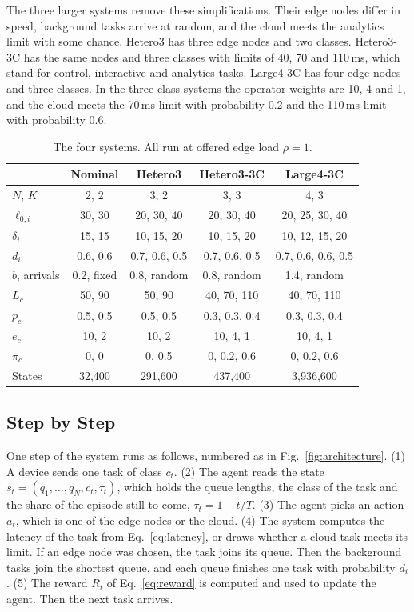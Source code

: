 The three larger systems remove these simplifications. Their edge nodes differ in speed, background tasks arrive at random, and the cloud meets the analytics limit with some chance. Hetero3 has three edge nodes and two classes. Hetero3-3C has the same nodes and three classes with limits of 40, 70 and 110\,ms, which stand for control, interactive and analytics tasks. Large4-3C has four edge nodes and three classes. In the three-class systems the operator weights are 10, 4 and 1, and the cloud meets the 70\,ms limit with probability 0.2 and the 110\,ms limit with probability 0.6.

\begin{table}[t]
\caption{The four systems. All run at offered edge load $\rho=1$.}
\label{tab:systems}
\centering
\footnotesize
\setlength{\tabcolsep}{2.5pt}
\begin{tabular}{@{}lcccc@{}}
\toprule
 & Nominal & Hetero3 & Hetero3-3C & Large4-3C \\
\midrule
$N$, $K$ & 2, 2 & 3, 2 & 3, 3 & 4, 3 \\
$\ell_{0,i}$ & 30, 30 & 20, 30, 40 & 20, 30, 40 & 20, 25, 30, 40 \\
$\delta_i$ & 15, 15 & 10, 15, 20 & 10, 15, 20 & 10, 12, 15, 20 \\
$d_i$ & 0.6, 0.6 & 0.7, 0.6, 0.5 & 0.7, 0.6, 0.5 & 0.7, 0.6, 0.6, 0.5 \\
$b$, arrivals & 0.2, fixed & 0.8, random & 0.8, random & 1.4, random \\
$L_c$ & 50, 90 & 50, 90 & 40, 70, 110 & 40, 70, 110 \\
$p_c$ & 0.5, 0.5 & 0.5, 0.5 & 0.3, 0.3, 0.4 & 0.3, 0.3, 0.4 \\
$e_c$ & 10, 2 & 10, 2 & 10, 4, 1 & 10, 4, 1 \\
$\pi_c$ & 0, 0 & 0, 0.5 & 0, 0.2, 0.6 & 0, 0.2, 0.6 \\
States & 32,400 & 291,600 & 437,400 & 3,936,600 \\
\bottomrule
\end{tabular}
\end{table}

\subsection{Step by Step}
\label{sec:steps}
One step of the system runs as follows, numbered as in Fig.~\ref{fig:architecture}. (1) A device sends one task of class $c_t$. (2) The agent reads the state $s_t = (q_1,\dots,q_N, c_t, \tau_t)$, which holds the queue lengths, the class of the task and the share of the episode still to come, $\tau_t = 1 - t/T$. (3) The agent picks an action $a_t$, which is one of the edge nodes or the cloud. (4) The system computes the latency of the task from Eq.~\eqref{eq:latency}, or draws whether a cloud task meets its limit. If an edge node was chosen, the task joins its queue. Then the background tasks join the shortest queue, and each queue finishes one task with probability $d_i$. (5) The reward $R_t$ of Eq.~\eqref{eq:reward} is computed and used to update the agent. Then the next task arrives.

